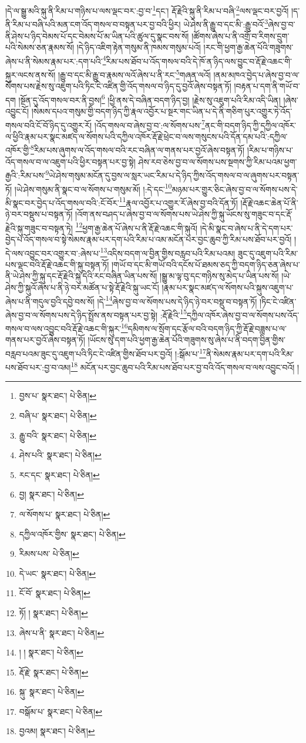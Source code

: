 །དེ་ལ་སྒྱུ་མའི་སྐུ་ནི་རིམ་པ་གཉིས་པ་ལས་ལྡང་བར་:བྱ་བ་\footnote{བྱས་པ་  སྣར་ཐང་།  པེ་ཅིན། }དང་། རྡོ་རྗེའི་སྐུ་ནི་རིམ་པ་བཞི་\footnote{བཞི་པ་  སྣར་ཐང་།  པེ་ཅིན། }ལས་ལྡང་བར་བྱའོ། །ད་ནི་རིམ་པ་བཞི་པའི་མན་ངག་འོད་གསལ་བ་བསྟན་པར་བྱ་བའི་ཕྱིར། ཡེ་ཤེས་ནི་རྒྱུ་བ་དང་མི་:རྒྱུ་བའོ་\footnote{རྒྱུ་བའི་  སྣར་ཐང་།  པེ་ཅིན། }ཞེས་བྱ་བ་ནི་ཤེས་པ་ཉིད་བེམས་པོ་དང་བེམས་པོ་མ་ཡིན་པའི་ཚུལ་དུ་སྣང་བས་སོ། །ཚོགས་ཞེས་པ་ནི་འགྲོ་བ་རིགས་དྲུག་པའི་སེམས་ཅན་རྣམས་སོ། །དེ་ཉིད་འཇིག་རྟེན་གསུམ་ནི་ཁམས་གསུམ་པའོ། །རང་གི་ཕྱག་རྒྱ་ཆེན་པོའི་གཟུགས་ཞེས་པ་ནི་སེམས་རྣམ་པར་:དག་པའི་\footnote{ཤེས་པའི་  སྣར་ཐང་།  པེ་ཅིན། }རིམ་པས་ཐོབ་པ་འོད་གསལ་བའི་དེ་ཁོ་ན་ཉིད་ལས་བྱུང་བ་རྡོ་རྗེ་འཆང་གི་སྐུར་ལངས་ནས་སོ། །རྒྱུ་བ་དང་མི་རྒྱུ་བ་རྣམས་ལའོ་ཞེས་པ་ནི་རང་\footnote{རང་དང་  སྣར་ཐང་།  པེ་ཅིན། }གཞན་ལའོ། །ནམ་མཁའ་བྱེད་པ་ཞེས་བྱ་བ་ལ་སོགས་པས་རྗེས་སུ་འཇུག་པའི་ཏིང་ངེ་འཛིན་གྱི་འོད་གསལ་བ་ཉིད་དུ་བྱའོ་ཞེས་བསྟན་ཏོ། །བརྟན་པ་དག་ནི་གཡོ་བ་དག །སྔོན་དུ་འོད་གསལ་བར་ནི་བྱས།\footnote{བྱ།  སྣར་ཐང་།  པེ་ཅིན། } །ཕྱི་ནས་དེ་བཞིན་བདག་ཉིད་བྱ། །རྗེས་སུ་འཇུག་པའི་རིམ་འདི་ཡིན། །ཞེས་འབྱུང་ངོ། །སེམས་དཔའ་གསུམ་གྱི་བདག་ཉིད་ཀྱི་རྣལ་འབྱོར་པ་སྔར་གང་ཡིན་པ་དེ་ནི་གཅིག་པུར་འགྱུར་ཏེ་འོད་གསལ་བའི་ངོ་བོ་ཉིད་དུ་འགྱུར་རོ། །འོད་གསལ་བ་ཞེས་བྱ་བ་:ལ་སོགས་པས་\footnote{ལ་སོགས་པ་  སྣར་ཐང་།  པེ་ཅིན། }ནང་གི་བདག་ཉིད་ཀྱི་དཀྱིལ་འཁོར་ལ་ཕྱིའི་རྣམ་པར་སྣང་མཛད་ལ་སོགས་པའི་དཀྱིལ་འཁོར་རྡོ་རྗེ་ཕྲེང་བ་ལས་གསུངས་པའི་དོན་དམ་པའི་:དཀྱིལ་འཁོར་གྱི་\footnote{དཀྱིལ་འཁོར་གྱིས་  སྣར་ཐང་།  པེ་ཅིན། }རིམ་པས་ཞུགས་ལ་འོད་གསལ་བའི་རང་བཞིན་ལ་གནས་པར་བྱའོ་ཞེས་བསྟན་ཏོ། །རིམ་པ་གཉིས་པ་འོད་གསལ་བ་ལ་འཇུག་པའི་ཕྱིར་བསྟན་པར་བྱ་སྟེ། ཤེས་རབ་ཅེས་བྱ་བ་ལ་སོགས་པས་སྔགས་ཀྱི་རིམ་པའམ་ཕྱག་རྒྱའི་:རིམ་པས་\footnote{རིམས་པས་  པེ་ཅིན། }ཡེ་ཤེས་གསུམ་མངོན་དུ་བྱས་ལ་སླར་ཡང་རིམ་པ་དེ་ཉིད་ཀྱིས་འོད་གསལ་བ་ལ་ཞུགས་པར་བསྟན་ཏོ། །ཡེ་ཤེས་གསུམ་ནི་སྣང་བ་ལ་སོགས་པ་གསུམ་མོ། །:དེ་དང་\footnote{དེ་ཡང་  སྣར་ཐང་།  པེ་ཅིན། }མཉམ་པར་གྱུར་ཅིང་ཞེས་བྱ་བ་ལ་སོགས་པས་དེ་མི་སྣང་བར་བྱེད་པ་འོད་གསལ་བའི་:ངོ་བོར་\footnote{ངོ་བོ་  སྣར་ཐང་།  པེ་ཅིན། }རྣལ་འབྱོར་པ་འགྱུར་རོ་ཞེས་བྱ་བའི་དོན་ཏོ། །རྡོ་རྗེ་འཆང་ཆེན་པོ་ནི་ཉེ་བར་བསྡུས་པ་བསྟན་ཏོ། །འོག་ནས་བཤད་པ་ཞེས་བྱ་བ་ལ་སོགས་པས་ཡེ་ཤེས་ཀྱི་སྐུ་ཡོངས་སུ་གཟུང་བ་དང་རྡོ་རྗེའི་སྐུ་གཟུང་བ་བསྟན་ཏེ། \footnote{ཏོ། །   སྣར་ཐང་།  པེ་ཅིན། }ཕྱག་རྒྱ་ཆེན་པོ་ཞེས་པ་ནི་རྡོ་རྗེ་འཆང་གི་སྐུའོ། །དེ་མི་སྣང་བ་ཞེས་པ་ནི་དེ་དག་པར་བྱེད་པ་འོད་གསལ་བ་སྟེ་སེམས་རྣམ་པར་དག་པའི་རིམ་པ་འམ་མངོན་པར་བྱང་ཆུབ་ཀྱི་རིམ་པས་ཐོབ་པར་བྱའོ། །དེ་ལས་འབྱུང་བར་འགྱུར་བ་:ཞེས་པ་\footnote{ཞེས་པ་ནི་  སྣར་ཐང་།  པེ་ཅིན། }འདིས་བདག་ལ་བྱིན་གྱིས་བརླབ་པའི་རིམ་པའམ། ཟུང་དུ་འཇུག་པའི་རིམ་པས་ལྡང་བའི་རྡོ་རྗེ་འཆང་གི་སྐུ་བསྟན་ཏོ། །གཡོ་བ་དང་མི་གཡོ་བའི་དངོས་པོ་ཐམས་ཅད་ཀྱི་བདག་ཉིད་ཅན་ཞེས་པ་ནི་ཡེ་ཤེས་ཀྱི་སྐུ་དང་རྡོ་རྗེའི་སྐུ་དེའི་རང་བཞིན་ཡིན་པས་སོ། །སྒྱུ་མ་ལྟ་བུ་དང་གཉིས་སུ་མེད་པ་ཡིན་པས་སོ། །ཡེ་ཤེས་ཀྱི་སྐུའོ་ཞེས་པ་ནི་ཉེ་བར་མཚོན་པ་སྟེ་རྡོ་རྗེའི་སྐུ་ཡང་ངོ། །རྣམ་པར་སྣང་མཛད་ལ་སོགས་པའི་སྐུས་འཇུག་པ་ཞེས་པ་ནི་གདུལ་བྱའི་དབྱེ་བས་སོ། །དེ་\footnote{། །  སྣར་ཐང་།  པེ་ཅིན། }ཞེས་བྱ་བ་ལ་སོགས་པས་དེ་ཉིད་ཉེ་བར་བསྡུ་བ་བསྟན་ཏོ། །ཏིང་ངེ་འཛིན་ཞེས་བྱ་བ་ལ་སོགས་པས་དེ་ཉིད་སྤྲོས་ནས་བསྟན་པར་བྱ་སྟེ། :རྡོ་རྗེའི་\footnote{རྡོ་རྗེ་  སྣར་ཐང་།  པེ་ཅིན། }དཀྱིལ་འཁོར་ཞེས་བྱ་བ་ལ་སོགས་པས་འོད་གསལ་བ་ལས་འབྱུང་བའི་རྡོ་རྗེ་འཆང་གི་སྐུར་\footnote{སྐུ་  སྣར་ཐང་།  པེ་ཅིན། }དམིགས་ལ་སྲོག་དང་རྩོལ་བའི་བདག་ཉིད་ཀྱི་རྡོ་རྗེ་བཟླས་པ་ལ་གནས་པར་བྱའོ་ཞེས་བསྟན་ཏོ། །ཡོངས་སུ་དག་པའི་ཕྱག་རྒྱ་ཆེན་པོའི་གཟུགས་སུ་ཞེས་པ་ནི་བདག་བྱིན་གྱིས་བརླབ་པའམ་ཟུང་དུ་འཇུག་པའི་ཏིང་ངེ་འཛིན་གྱིས་ཐོབ་པར་བྱའོ། །:སྒོམ་པ་\footnote{བསྒོམ་པ་  སྣར་ཐང་།  པེ་ཅིན། }ནི་སེམས་རྣམ་པར་དག་པའི་རིམ་པས་ཐོབ་པར་:བྱ་བ་འམ།\footnote{བྱའམ།  སྣར་ཐང་།  པེ་ཅིན། } མངོན་པར་བྱང་ཆུབ་པའི་རིམ་པས་ཐོབ་པར་བྱ་བའི་འོད་གསལ་བ་ལས་འབྱུང་བའོ། །
